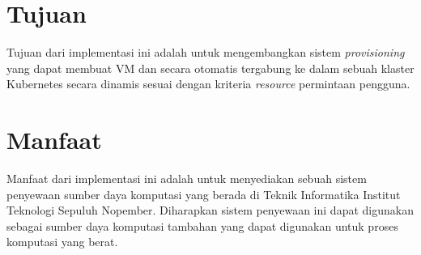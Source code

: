 \section{Tujuan}
\label{sec:Tujuan}

Tujuan dari implementasi ini adalah untuk mengembangkan sistem \emph{provisioning}
yang dapat membuat VM dan secara otomatis tergabung ke dalam sebuah klaster Kubernetes secara dinamis sesuai dengan kriteria
\emph{resource} permintaan pengguna.

\section{Manfaat}
\label{sec:sistematikapenulisan}

Manfaat dari implementasi ini adalah untuk menyediakan sebuah sistem penyewaan
sumber daya komputasi yang berada di Teknik Informatika Institut Teknologi Sepuluh
Nopember. Diharapkan sistem penyewaan ini dapat digunakan sebagai sumber daya komputasi
tambahan yang dapat digunakan untuk proses komputasi yang berat.

